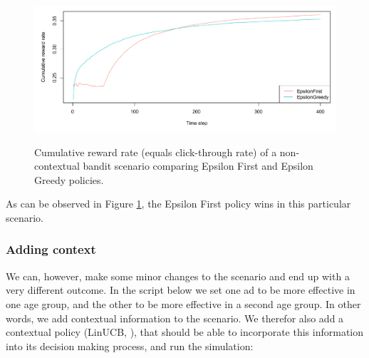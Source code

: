 \documentclass{jss}\usepackage[]{graphicx}\usepackage[]{color}
\begin{document}
\begin{figure}[H]
\centering
\includegraphics[width=.99\textwidth]{fig/simple_one}
\label{fig:simple_one}
\caption{Cumulative reward rate (equals click-through rate) of a non-contextual bandit scenario comparing Epsilon First and Epsilon Greedy policies.}
\end{figure}

As can be observed in Figure \ref{fig:simple_one}, the Epsilon First policy wins in this particular scenario.

\subsubsection{Adding context}

We can, however, make some minor changes to the scenario and end up with a very different outcome. In the script below we set one ad to be more effective in one age group, and the other to be more effective in a second age group. In other words, we add contextual information to the scenario. We therefor also add a contextual policy (LinUCB, \cite{Li2010}), that should be able to incorporate this information into its decision making process, and run the simulation:
\end{document}
